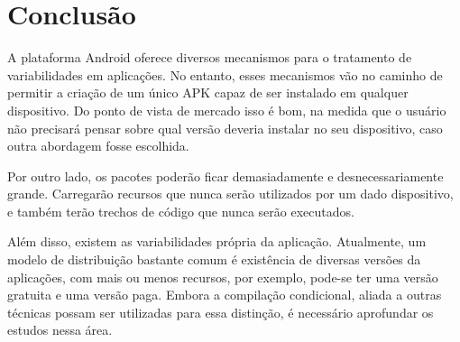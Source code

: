 \chapter{Conclusão}

A plataforma Android oferece diversos mecanismos para o tratamento de variabilidades
em aplicações. No entanto, esses mecanismos vão no caminho de permitir a criação 
de um único APK capaz de ser instalado em qualquer dispositivo. Do ponto de vista 
de mercado isso é bom, na medida que o usuário não precisará pensar sobre qual 
versão deveria instalar no seu dispositivo, caso outra abordagem fosse escolhida.

Por outro lado, os pacotes poderão ficar demasiadamente e desnecessariamente grande.
Carregarão recursos que nunca serão utilizados por um dado dispositivo, e também 
terão trechos de código que nunca serão executados.

Além disso, existem as variabilidades própria da aplicação. Atualmente, um modelo 
de distribuição bastante comum é existência de diversas versões da aplicações, com 
mais ou menos recursos, por exemplo, pode-se ter uma versão gratuita e uma versão paga. 
Embora a compilação condicional, aliada a outras técnicas possam ser utilizadas para essa distinção, é necessário aprofundar os estudos nessa área.
